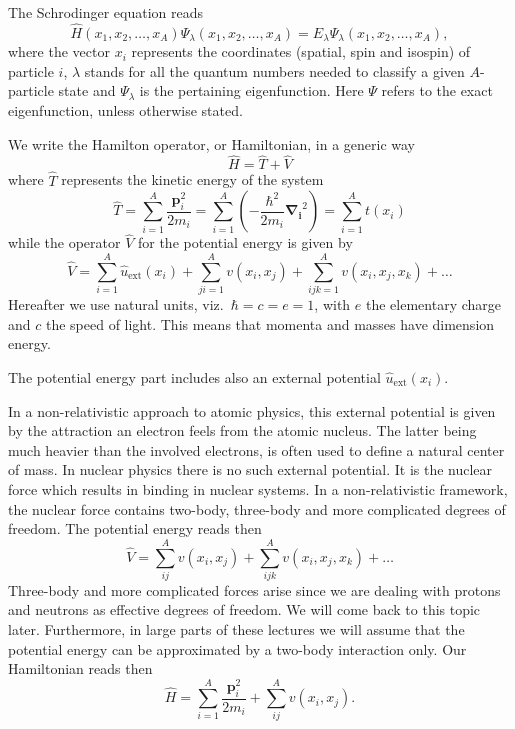 \documentclass[%
twoside,                 %
final,                   %
10pt]{article}
\begin{document}
The Schrodinger equation reads 
\begin{equation}
\hat{H}(x_1, x_2, \dots , x_A) \Psi_{\lambda}(x_1, x_2, \dots , x_A) = 
E_\lambda  \Psi_\lambda(x_1, x_2, \dots , x_A), \label{eq:basicSE1}
\end{equation}
where the vector $x_i$ represents the coordinates (spatial, spin and isospin) of particle $i$, $\lambda$ stands  for all the quantum
numbers needed to classify a given $A$-particle state and $\Psi_{\lambda}$ is the pertaining eigenfunction.  Here
$\Psi$ refers to the exact eigenfunction, unless otherwise stated.


We write the Hamilton operator, or Hamiltonian,  in a generic way 
\[
	\hat{H} = \hat{T} + \hat{V} 
\]
where $\hat{T}$  represents the kinetic energy of the system
\[
	\hat{T} = \sum_{i=1}^A \frac{\mathbf{p}_i^2}{2m_i} = \sum_{i=1}^A \left( -\frac{\hbar^2}{2m_i} \mathbf{\nabla_i}^2 \right) =
		\sum_{i=1}^A t(x_i)
\]
while the operator $\hat{V}$ for the potential energy is given by
\begin{equation}
	\hat{V} = \sum_{i=1}^A \hat{u}_{\mathrm{ext}}(x_i) + \sum_{ji=1}^A v(x_i,x_j)+\sum_{ijk=1}^Av(x_i,x_j,x_k)+\dots
\label{eq:firstv}
\end{equation}
Hereafter we use natural units, viz.~$\hbar=c=e=1$, with $e$ the elementary charge and $c$ the speed of light. This means that momenta and masses
have dimension energy. 


The potential energy part includes also an external potential $\hat{u}_{\mathrm{ext}}(x_i)$.

In a non-relativistic approach to atomic  physics, this external potential is given by the attraction an electron feels from the atomic nucleus. The latter being much heavier than the involved electrons, is often used to define a natural center of mass. In nuclear physics there is no such external potential. It is the nuclear force which results in binding in nuclear systems. In a non-relativistic framework, the nuclear force contains two-body, three-body and more complicated degrees of freedom. The potential energy reads then  
\[
	\hat{V} = \sum_{ij}^A v(x_i,x_j)+\sum_{ijk}^Av(x_i,x_j,x_k)+\dots
\]
Three-body and more  complicated forces arise since we are dealing with protons and neutrons as effective degrees of freedom. We will come back to this topic later. Furthermore, in large parts of these lectures we will assume that the potential energy can be approximated by a two-body interaction only. Our Hamiltonian reads then
\begin{equation}
	\hat{H} = \sum_{i=1}^A \frac{\mathbf{p}_i^2}{2m_i}+\sum_{ij}^A v(x_i,x_j).
\label{eq:firstH}
\end{equation}
\end{document}
